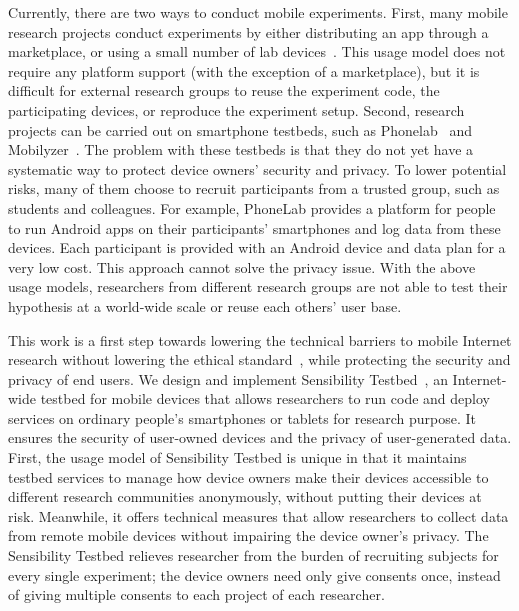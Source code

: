 Currently, there are two ways to conduct mobile experiments. 
First, many mobile research projects conduct experiments 
by either distributing an app through a marketplace, or using a 
small number of lab devices~\cite{hao2013isleep, wang2012no, 
wang2013sensing}. This usage model does not require any 
platform support (with the exception of a marketplace), but it 
is difficult for external research groups to reuse the experiment 
code, the participating devices, or reproduce the experiment 
setup. Second, research projects can be carried out on 
smartphone testbeds, such as Phonelab~\cite{phonelab, 
nandugudi2013phonelab} and 
Mobilyzer~\cite{nikravesh2015mobilyzer}. 
The problem with these testbeds is that they do not yet 
have a systematic way to protect device owners' security and 
privacy. To lower potential risks, many of them choose to 
recruit participants from a trusted group, such as students and 
colleagues. For example, PhoneLab provides a platform for 
people to run Android apps on their participants' smartphones 
and log data from these devices. Each participant is provided 
with an Android device and data plan for a very low cost. This 
approach cannot solve the privacy issue. With the above usage 
models, researchers from different research groups are not 
able to test their hypothesis at a world-wide scale or reuse each 
others' user base.
					
This work is a first step towards lowering the technical
barriers to mobile Internet research without lowering the
ethical standard~\cite{zevenbergen2013ethical}, while 
protecting the security and privacy of end users. We design 
and implement Sensibility Testbed~\cite{sensibility, 
zhuang2014sensibility}, an Internet-wide testbed for mobile devices that
allows researchers to run code and deploy services on ordinary
people's smartphones or tablets for research purpose. It ensures
the security of user-owned devices and the privacy of
user-generated data. First, the usage model of Sensibility Testbed is
unique in that it maintains testbed services to manage how device 
owners make their devices accessible to different research 
communities anonymously, without putting
their devices at risk. Meanwhile, it offers technical measures
that allow researchers to collect data from remote mobile
devices without impairing the device owner's privacy. The
Sensibility Testbed relieves researcher from the burden of
recruiting subjects for every single experiment; the device
owners need only give consents once, instead of giving multiple
consents to each project of each researcher.

